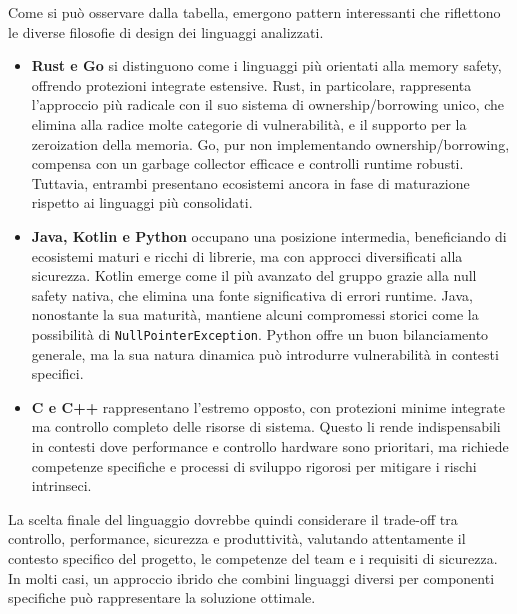 
\bigskip
\noindent

Come si può osservare dalla tabella, emergono pattern interessanti che riflettono
le diverse filosofie di design dei linguaggi analizzati.

\begin{itemize}
  \item \textbf{Rust e Go} si distinguono come i linguaggi più orientati alla
    memory safety, offrendo protezioni integrate estensive. Rust, in particolare,
    rappresenta l'approccio più radicale con il suo sistema di ownership/borrowing
    unico, che elimina alla radice molte categorie di vulnerabilità, e il
    supporto per la zeroization della memoria. Go, pur non implementando
    ownership/borrowing, compensa con un garbage collector efficace e controlli runtime
    robusti. Tuttavia, entrambi presentano ecosistemi ancora in fase di maturazione
    rispetto ai linguaggi più consolidati.

  \item \textbf{Java, Kotlin e Python} occupano una posizione intermedia, beneficiando
    di ecosistemi maturi e ricchi di librerie, ma con approcci diversificati
    alla sicurezza. Kotlin emerge come il più avanzato del gruppo grazie alla null
    safety nativa, che elimina una fonte significativa di errori runtime. Java,
    nonostante la sua maturità, mantiene alcuni compromessi storici come la possibilità
    di \texttt{NullPointerException}. Python offre un buon bilanciamento generale,
    ma la sua natura dinamica può introdurre vulnerabilità in contesti specifici.

  \item \textbf{C e C++} rappresentano l'estremo opposto, con protezioni minime integrate
    ma controllo completo delle risorse di sistema. Questo li rende
    indispensabili in contesti dove performance e controllo hardware sono
    prioritari, ma richiede competenze specifiche e processi di sviluppo rigorosi
    per mitigare i rischi intrinseci.
\end{itemize}

La scelta finale del linguaggio dovrebbe quindi considerare il trade-off tra
controllo, performance, sicurezza e produttività, valutando attentamente il contesto
specifico del progetto, le competenze del team e i requisiti di sicurezza. In molti
casi, un approccio ibrido che combini linguaggi diversi per componenti
specifiche può rappresentare la soluzione ottimale.